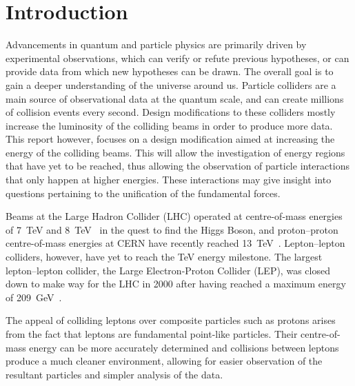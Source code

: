 
\section{Introduction}

Advancements in quantum and particle physics are primarily driven by
experimental observations, which can verify or refute previous hypotheses, or
can provide data from which new hypotheses can be drawn.  The overall goal is to
gain a deeper understanding of the universe around us.  Particle colliders are a
main source of observational data at the quantum scale, and can create millions
of collision events every second.  Design modifications to these colliders
mostly increase the luminosity of the colliding beams in order to produce more
data.  This report however, focuses on a design modification aimed at increasing
the energy of the colliding beams. This will allow the investigation of energy
regions that have yet to be reached, thus allowing the observation of particle
interactions that only happen at higher energies. These interactions may give
insight into questions pertaining to the unification of the fundamental forces.

Beams at the Large Hadron Collider (LHC) operated at centre-of-mass energies of
\SI{7}{\tera\electronvolt} and \SI{8}{\tera\electronvolt}~\cite{Flechl2015xxa}
in the quest to find the Higgs Boson, and proton--proton centre-of-mass energies
at CERN have recently reached \SI{13}{\tera\electronvolt}~\cite{CMS:2015bta}.
Lepton--lepton colliders, however, have yet to reach the \si{\tera\electronvolt}
energy milestone. The largest lepton--lepton collider, the Large
Electron-Proton Collider (LEP), was closed down to make way for the LHC in
\num{2000} after having reached a maximum energy of
\SI{209}{\giga\electronvolt}~\cite{Barate2003sz}.

The appeal of colliding leptons over composite particles such as protons arises
from the fact that leptons are fundamental point-like particles. Their
centre-of-mass energy can be more accurately determined and collisions between
leptons produce a much cleaner environment, allowing for easier observation of
the resultant particles and simpler analysis of the data.

